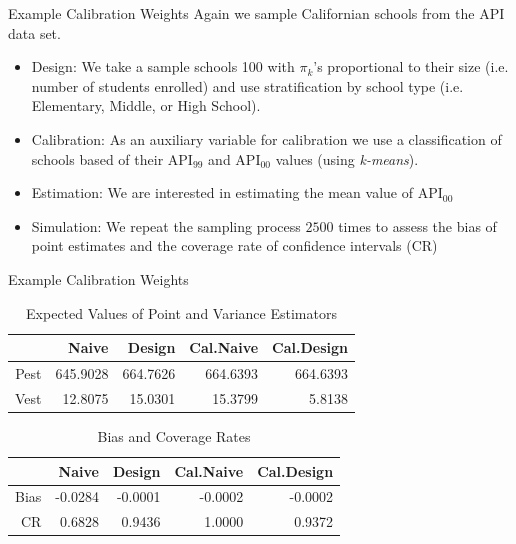\documentclass{beamer}\usepackage[]{graphicx}\usepackage[]{color}
\begin{document}
\begin{frame}{Example Calibration Weights}
Again we sample Californian schools from the API data set.

\begin{itemize}
\item Design: We take a sample schools 100 with $\pi_k$'s proportional to their size (i.e. number of students enrolled) and use stratification by school type (i.e. Elementary, Middle, or High School).
\item Calibration: As an auxiliary variable for calibration we use a classification of schools based of their $\text{API}_{99}$ and $\text{API}_{00}$ values (using \emph{k-means}).
\item Estimation: We are interested in estimating the mean value of $\text{API}_{00}$
\item Simulation: We repeat the sampling process $2500$ times to assess the bias of point estimates and the coverage rate of confidence intervals (CR)
\end{itemize}
\end{frame}

 
\begin{frame}[fragile]{Example Calibration Weights}
\begin{table}[ht]
\centering
\caption{Expected Values of Point and Variance Estimators} 
\begin{tabular}{rrrrr}
  \hline
 & Naive & Design & Cal.Naive & Cal.Design \\ 
  \hline
Pest & 645.9028 & 664.7626 & 664.6393 & 664.6393 \\ 
  Vest & 12.8075 & 15.0301 & 15.3799 & 5.8138 \\ 
   \hline
\end{tabular}
\end{table}


\begin{table}[ht]
\centering
\caption{Bias and Coverage Rates} 
\begin{tabular}{rrrrr}
  \hline
 & Naive & Design & Cal.Naive & Cal.Design \\ 
  \hline
Bias & -0.0284 & -0.0001 & -0.0002 & -0.0002 \\ 
  CR & 0.6828 & 0.9436 & 1.0000 & 0.9372 \\ 
   \hline
\end{tabular}
\end{table}


\end{frame}
\end{document}
